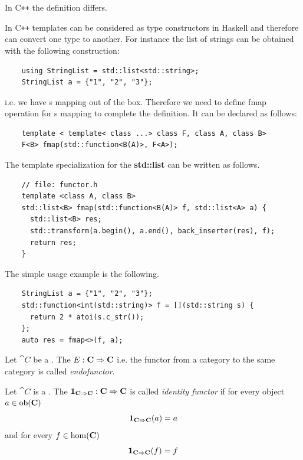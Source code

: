 In C\texttt{++} the definition differs.
\begin{example}
  \label{ex:functor_cpp}
  In C\texttt{++} templates can be considered as type constructors in Haskell
  and therefore can convert one type to another. For instance the
  list of strings can be obtained with the following construction:

  \begin{verbatim}
    using StringList = std::list<std::string>;
    StringList a = {"1", "2", "3"};
  \end{verbatim} 
  i.e. we have s mapping out of the box.
  Therefore we need to define fmap
  operation for s mapping to complete the
   definition. It can be declared as 
  follows:
  \begin{verbatim}
    template < template< class ...> class F, class A, class B> 
    F<B> fmap(std::function<B(A)>, F<A>);
  \end{verbatim}
  The template specialization for the \textbf{std::list} can be
  written as follows.
  \begin{verbatim}
    // file: functor.h
    template <class A, class B>
    std::list<B> fmap(std::function<B(A)> f, std::list<A> a) {
      std::list<B> res;
      std::transform(a.begin(), a.end(), back_inserter(res), f);
      return res;
    }
  \end{verbatim} 

  The simple usage example is the following.
  \begin{verbatim}
    StringList a = {"1", "2", "3"};
    std::function<int(std::string)> f = [](std::string s) {
      return 2 * atoi(s.c_str());
    };
    auto res = fmap<>(f, a);
  \end{verbatim}
\end{example}


\begin{definition}[Endofunctor]
  \label{def:endofunctor}
  Let $\cat{C}$ be a . The
   $E: \mathbf{C} \Rightarrow \mathbf{C}$ i.e. 
  the functor from a category to the same category is called
  \textit{endofunctor}. 
\end{definition}

\begin{definition}
  \label{def:idfunctor}
  Let $\cat{C}$ is a . The
   $\mathbf{1}_{ \mathbf{C} \Rightarrow \mathbf{C} }: \mathbf{C} \Rightarrow \mathbf{C}$ is called \textit{identity
    functor} if for every object $a \in \mathrm{ob}(\mathbf{C})$
  \[
  \mathbf{1}_{ \mathbf{C} \Rightarrow \mathbf{C} }(a) = a
  \]
  and for every  $f \in \mathrm{hom}(\mathbf{C})$
  \[
  \mathbf{1}_{ \mathbf{C} \Rightarrow \mathbf{C} }(f) = f
  \] 
\end{definition}

